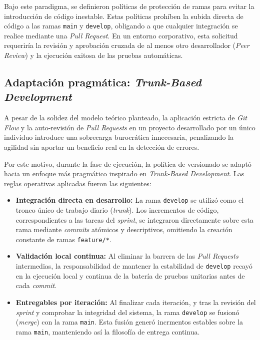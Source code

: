 Bajo este paradigma, se definieron políticas de protección de ramas para evitar la introducción de código inestable. Estas políticas prohíben la subida directa de código a las ramas \texttt{main} y \texttt{develop}, obligando a que cualquier integración se realice mediante una \emph{Pull Request}. En un entorno corporativo, esta solicitud requeriría la revisión y aprobación cruzada de al menos otro desarrollador (\emph{Peer Review}) y la ejecución exitosa de las pruebas automáticas.

\subsection{Adaptación pragmática: \emph{Trunk-Based Development}}
A pesar de la solidez del modelo teórico planteado, la aplicación estricta de \emph{Git Flow} y la auto-revisión de \emph{Pull Requests} en un proyecto desarrollado por un único individuo introduce una sobrecarga burocrática innecesaria, penalizando la agilidad sin aportar un beneficio real en la detección de errores.

Por este motivo, durante la fase de ejecución, la política de versionado se adaptó hacia un enfoque más pragmático inspirado en \emph{Trunk-Based Development}. Las reglas operativas aplicadas fueron las siguientes:
\begin{itemize}
    \item \textbf{Integración directa en desarrollo:} La rama \texttt{develop} se utilizó como el tronco único de trabajo diario (\emph{trunk}). Los incrementos de código, correspondientes a las tareas del \emph{sprint}, se integraron directamente sobre esta rama mediante \emph{commits} atómicos y descriptivos, omitiendo la creación constante de ramas \texttt{feature/*}.
    \item \textbf{Validación local continua:} Al eliminar la barrera de las \emph{Pull Requests} intermedias, la responsabilidad de mantener la estabilidad de \texttt{develop} recayó en la ejecución local y continua de la batería de pruebas unitarias antes de cada \emph{commit}.
    \item \textbf{Entregables por iteración:} Al finalizar cada iteración, y tras la revisión del \emph{sprint} y comprobar la integridad del sistema, la rama \texttt{develop} se fusionó (\emph{merge}) con la rama \texttt{main}. Esta fusión generó incrmentos estables sobre la rama \texttt{main}, manteniendo así la filosofía de entrega continua.
\end{itemize}